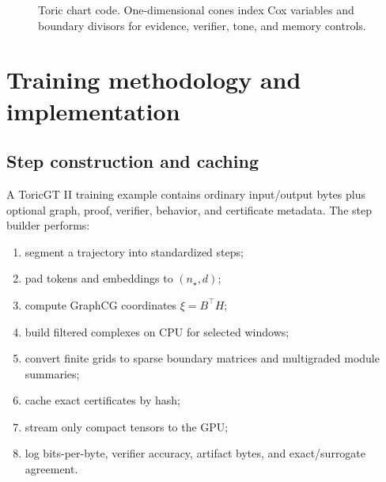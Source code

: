 \documentclass[10pt]{article}
\newcommand{\RR}{\mathbb{R}}
\numberwithin{equation}{section}
\begin{document}
\begin{figure}[h]
\centering
{}
\caption{Toric chart code. One-dimensional cones index Cox variables and boundary divisors for evidence, verifier, tone, and memory controls.}
\end{figure}

\section{Training methodology and implementation}
\subsection{Step construction and caching}
A ToricGT II training example contains ordinary input/output bytes plus optional graph, proof, verifier, behavior, and certificate metadata. The step builder performs:
\begin{enumerate}
\item segment a trajectory into standardized steps;
\item pad tokens and embeddings to $(n_\star,d)$;
\item compute GraphCG coordinates $\xi=B^\top H$;
\item build filtered complexes on CPU for selected windows;
\item convert finite grids to sparse boundary matrices and multigraded module summaries;
\item cache exact certificates by hash;
\item stream only compact tensors to the GPU;
\item log bits-per-byte, verifier accuracy, artifact bytes, and exact/surrogate agreement.
\end{enumerate}
\end{document}
